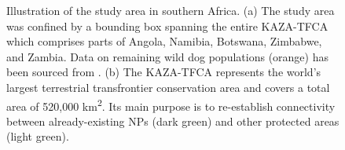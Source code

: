 \documentclass[../FinalThesis.tex]{subfiles}
\begin{document}
\begin{figure}[htbp]
  \begin{center}
    \caption{Illustration of the study area in southern Africa. (a) The study
    area was confined by a bounding box spanning the entire KAZA-TFCA which
    comprises parts of Angola, Namibia, Botswana, Zimbabwe, and Zambia. Data on
    remaining wild dog populations (orange) has been sourced from
    \citet{Woodroffe.2012}. (b) The KAZA-TFCA represents the world's largest
    terrestrial transfrontier conservation area and covers a total area of
    520,000 km\textsuperscript{2}. Its main purpose is to re-establish
    connectivity between already-existing NPs (dark green) and other protected
    areas (light green).}
    \label{StudyAreaCH1}
  \end{center}
\end{figure}
\end{document}
